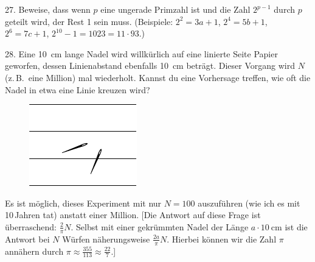 \begin{problem}{27.}
	Beweise, dass wenn $p$ eine ungerade Primzahl ist und die Zahl $2^{p-1}$ durch $p$ geteilt wird, der Rest 1 sein muss. (Beispiele: $2^2 = 3a +1$, $2^4 = 5b+1$, $2^6 = 7c+1$, $2^{10} - 1 = 1023 = 11\cdot 93$.)
\end{problem}

\begin{problem}{28.}
	Eine \SI{10}{\cm} lange Nadel wird willkürlich auf eine linierte Seite Papier geworfen, dessen Linienabstand ebenfalls \SI{10}{\cm} beträgt. Dieser Vorgang wird $N$ (z.\,B.\ eine Million) mal wiederholt.
	Kannst du eine Vorhersage treffen, wie oft die Nadel in etwa eine Linie kreuzen wird?
	\begin{figure}
		\includegraphics{resources/taskbook-12}
	\end{figure}
	Es ist möglich, dieses Experiment mit nur $N=100$ auszuführen (wie ich es mit 10\,Jahren tat) anstatt einer Million. [Die Antwort auf diese Frage ist überraschend: $\frac2{\pi}N$. Selbst mit einer gekrümmten Nadel der Länge $a \cdot \SI{10}{\cm}$ ist die Antwort bei $N$ Würfen näherungsweise $\frac{2a}{\pi}N$.
	Hierbei können wir die Zahl $\pi$ annähern durch $\pi \approx \frac{355}{113} \approx \frac{22}7$.]
\end{problem}

